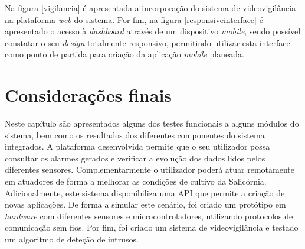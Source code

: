 \newpage

Na figura \ref{vigilancia} é apresentada a incorporação do sistema de videovigilância na plataforma \textit{web} do sistema. Por fim, na figura \ref{responsiveinterface} é apresentado o acesso à \textit{dashboard} através de um dispositivo \textit{mobile}, sendo possível constatar o seu \textit{design} totalmente responsivo, permitindo utilizar esta interface como ponto de partida para criação da aplicação \textit{mobile} planeada. 




\section{Considerações finais}



Neste capítulo são apresentados alguns dos testes funcionais a alguns módulos do sistema, bem como os resultados dos diferentes componentes do sistema integrados.  A plataforma desenvolvida permite que o seu utilizador possa consultar os alarmes gerados e verificar a evolução dos dados lidos pelos diferentes sensores. Complementarmente o utilizador poderá atuar remotamente em atuadores de forma a melhorar as condições de cultivo da Salicórnia. Adicionalmente, este sistema disponibiliza uma API que permite a criação de novas aplicações. De forma a simular este cenário, foi criado um protótipo em \textit{hardware} com diferentes sensores e microcontroladores, utilizando protocolos de comunicação sem fios. Por fim, foi criado um sistema de videovigilância e testado um algoritmo de deteção de intrusos. 



